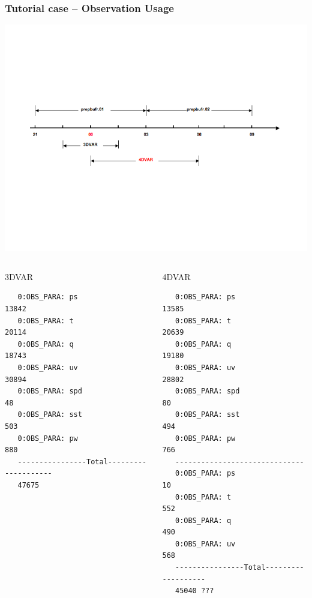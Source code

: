\documentclass[10pt]{beamer}
\begin{document}
\begin{frame}[fragile]
\frametitle{Tutorial case -- Observation Usage}
\begin{center}
\includegraphics[scale=0.40, trim=25 200 50 150, clip]{obs_usage} 
\end{center}\pause
\begin{columns}[c]
\column{5cm}
\begin{beamerboxesrounded}[ lower=postit,shadow=true]{3DVAR}
{\tiny
\begin{verbatim}
   0:OBS_PARA: ps                       13842
   0:OBS_PARA: t                        20114
   0:OBS_PARA: q                        18743
   0:OBS_PARA: uv                       30894
   0:OBS_PARA: spd                         48
   0:OBS_PARA: sst                        503
   0:OBS_PARA: pw                         880
   ----------------Total--------------------
   47675
\end{verbatim}
}
\end{beamerboxesrounded}
\column{5cm}
\begin{beamerboxesrounded}[ lower=postit,shadow=true]{4DVAR}
{\tiny
\begin{verbatim}
   0:OBS_PARA: ps                       13585
   0:OBS_PARA: t                        20639
   0:OBS_PARA: q                        19180
   0:OBS_PARA: uv                       28802
   0:OBS_PARA: spd                         80
   0:OBS_PARA: sst                        494
   0:OBS_PARA: pw                         766
   ------------------------------
   0:OBS_PARA: ps                          10
   0:OBS_PARA: t                          552
   0:OBS_PARA: q                          490
   0:OBS_PARA: uv                         568
   ----------------Total-------------------
   45040 ???
\end{verbatim}
}
\end{beamerboxesrounded}
\end{columns}
\end{frame}
\end{document}
